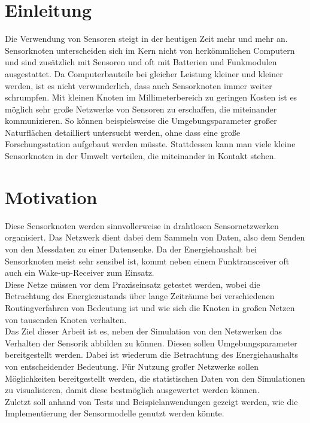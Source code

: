 \chapter{Einleitung}

Die Verwendung von Sensoren steigt in der heutigen Zeit mehr und mehr an. Sensorknoten unterscheiden sich im Kern nicht von herkömmlichen Computern und sind zusätzlich mit Sensoren und oft mit Batterien und Funkmodulen ausgestattet. Da Computerbauteile bei gleicher Leistung kleiner und kleiner werden, ist es nicht verwunderlich, dass auch Sensorknoten immer weiter schrumpfen. Mit kleinen Knoten im Millimeterbereich zu geringen Kosten ist es möglich sehr große Netzwerke von Sensoren zu erschaffen, die miteinander kommunizieren. So können beispielsweise die Umgebungsparameter großer Naturflächen detailliert untersucht werden, ohne dass eine große Forschungsstation aufgebaut werden müsste. Stattdessen kann man viele kleine Sensorknoten in der Umwelt verteilen, die miteinander in Kontakt stehen. \newline

\chapter{Motivation}

Diese Sensorknoten werden sinnvollerweise in drahtlosen Sensornetzwerken organisiert. Das Netzwerk dient dabei dem Sammeln von Daten, also dem Senden von den Messdaten zu einer Datensenke. Da der Energiehaushalt bei Sensorknoten meist sehr sensibel ist, kommt neben einem Funktransceiver oft auch ein Wake-up-Receiver zum Einsatz.\\
Diese Netze müssen vor dem Praxiseinsatz getestet werden, wobei die Betrachtung des Energiezustands über lange Zeiträume bei verschiedenen Routingverfahren von Bedeutung ist und wie sich die Knoten in großen Netzen von tausenden Knoten verhalten.\\
Das Ziel dieser Arbeit ist es, neben der Simulation von den Netzwerken das Verhalten der Sensorik abbilden zu können. Diesen sollen Umgebungsparameter bereitgestellt werden. Dabei ist wiederum die Betrachtung des Energiehaushalts von entscheidender Bedeutung. Für Nutzung großer Netzwerke sollen Möglichkeiten bereitgestellt werden, die statistischen Daten von den Simulationen zu visualisieren, damit diese bestmöglich ausgewertet werden können.\\
Zuletzt soll anhand von Tests und Beispielanwendungen gezeigt werden, wie die Implementierung der Sensormodelle genutzt werden könnte.